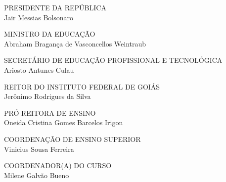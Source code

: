 \documentclass[
	10pt,				%
	openright,			%
	twoside,			%
	a4paper,			%
	english,			%
	french,				%
	brazil,				%
	sumario=tradicional
]{abntex2}
\begin{document}
\begin{titlingpage}
\phantom{xxx}
\vspace{0.5cm}
\begin{center}
	\par
	{\large PRESIDENTE DA REPÚBLICA \\ Jair Messias Bolsonaro}\vspace*{1cm}
	\par
	{\large MINISTRO DA EDUCAÇÃO \\ Abraham Bragança de Vasconcellos Weintraub}\vspace*{1cm}
	\par
	{\large SECRETÁRIO DE EDUCAÇÃO PROFISSIONAL E TECNOLÓGICA \\ Ariosto Antunes Culau}\vspace*{1cm}
	\par
	{\large REITOR DO INSTITUTO FEDERAL DE GOIÁS \\ Jerônimo Rodrigues da Silva}\vspace*{1cm}
	\par
	{\large PRÓ-REITORA DE ENSINO \\ Oneida Cristina Gomes Barcelos Irigon}\vspace*{1cm}
	\par
	{\large COORDENAÇÃO DE ENSINO SUPERIOR \\ Vinicius Sousa Ferreira}\vspace*{1cm}
	\par
	{\large COORDENADOR(A) DO CURSO \\ Milene Galvão Bueno}\vspace*{1cm}
\end{center}

%

\end{titlingpage}

\listoffigures*
\cleardoublepage
\end{document}
